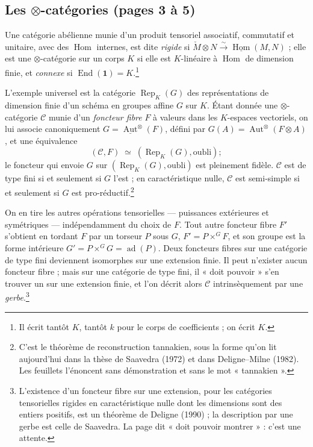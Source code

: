 \documentclass[11pt,a4paper]{article}
\begin{document}
\subsection*{Les $\otimes$-catégories (pages 3 à 5)}

Une catégorie abélienne munie d'un produit tensoriel associatif, commutatif et
unitaire, avec des $\operatorname{Hom}$ internes, est dite \emph{rigide} si
$\check{M} \otimes N \xrightarrow{\sim} \underline{\operatorname{Hom}}(M,N)$ ;
elle est une $\otimes$-catégorie sur un corps $K$ si elle est $K$-linéaire à
$\operatorname{Hom}$ de dimension finie, et \emph{connexe} si
$\operatorname{End}(\mathbf{1}) = K$.\footnote{Il écrit tantôt $K$, tantôt $k$
pour le corps de coefficients ; on écrit $K$.}

L'exemple universel est la catégorie $\operatorname{Rep}_{K}(G)$ des
représentations de dimension finie d'un schéma en groupes affine $G$ sur $K$.
Étant donnée une $\otimes$-catégorie $\mathcal{C}$ munie d'un \emph{foncteur
fibre} $F$ à valeurs dans les $K$-espaces vectoriels, on lui associe
canoniquement $G = \underline{\operatorname{Aut}}^{\otimes}(F)$, défini par
$G(A) = \operatorname{Aut}^{\otimes}(F \otimes A)$, et une équivalence
\[
(\mathcal{C}, F) \;\simeq\; (\operatorname{Rep}_{K}(G), \text{oubli}) ;
\]
le foncteur qui envoie $G$ sur $(\operatorname{Rep}_{K}(G), \text{oubli})$ est
pleinement fidèle. $\mathcal{C}$ est de type fini si et seulement si $G$ l'est ;
en caractéristique nulle, $\mathcal{C}$ est semi-simple si et seulement si $G$
est pro-réductif.\footnote{C'est le théorème de reconstruction tannakien, sous
la forme qu'on lit aujourd'hui dans la thèse de Saavedra (1972) et dans
Deligne--Milne (1982). Les feuillets l'énoncent sans démonstration et sans le
mot « tannakien ».}

On en tire les autres opérations tensorielles --- puissances extérieures et
symétriques --- indépendamment du choix de $F$. Tout autre foncteur fibre $F'$
s'obtient en tordant $F$ par un torseur $P$ sous $G$, $F' = P \times^{G} F$, et
son groupe est la forme intérieure $G' = P \times^{G} G = \operatorname{ad}(P)$.
Deux foncteurs fibres sur une catégorie de type fini deviennent isomorphes sur
une extension finie. Il peut n'exister aucun foncteur fibre ; mais sur une
catégorie de type fini, il « doit pouvoir » s'en trouver un sur une extension
finie, et l'on décrit alors $\mathcal{C}$ intrinsèquement par une
\emph{gerbe}.\footnote{L'existence d'un foncteur fibre sur une extension, pour
les catégories tensorielles rigides en caractéristique nulle dont les dimensions
sont des entiers positifs, est un théorème de Deligne (1990) ; la description
par une gerbe est celle de Saavedra. La page dit « doit pouvoir montrer » :
c'est une attente.}
\end{document}
